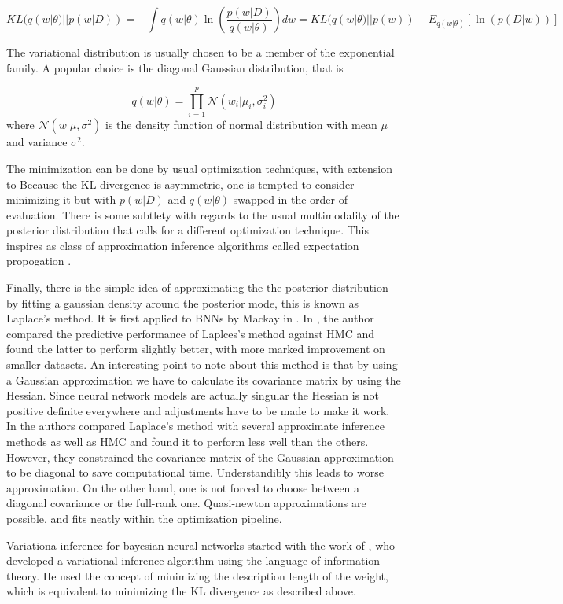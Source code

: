 \documentclass{book}
\begin{document}
\begin{enumerate}
\[ KL(q(w|\theta) || p(w|D)) = -\int q(w|\theta) \ln(\frac{p(w|D)}{q(w|\theta)}) dw = KL(q(w|\theta)||p(w)) - E_{q(w|\theta)}[\ln(p(D|w))] \]

The variational distribution is usually chosen to be a member of the exponential
family. A popular choice is the diagonal Gaussian distribution, that is 

\[ q(w|\theta) = \prod_{i=1}^p \mathcal{N}(w_i|\mu_i,\sigma^2_i) \]
where $\mathcal{N}(w|\mu,\sigma^2)$ is the density function of normal
distribution with mean $\mu$ and variance $\sigma^2$. 

The minimization can be done by usual optimization techniques, with extension to 
Because the KL divergence is asymmetric, one is tempted to consider
minimizing it but with $p(w|D)$ and $q(w|\theta)$ swapped in the order of
evaluation. There is some subtlety with regards to the usual multimodality of
the posterior distribution that calls for a different optimization technique.
This inspires as class of approximation inference algorithms called expectation
propogation \cite{minka2001expectation}. 

Finally, there is the simple idea of approximating the the posterior
distribution by fitting a gaussian density around the posterior mode, this is
known as Laplace's method. It is first applied to BNNs by Mackay in \cite{mackay1992evidence}. In \cite{vivarelli2001comparing}, the author compared the predictive performance of Laplces's method against HMC and found the latter to perform slightly better, with more marked improvement on smaller datasets. An interesting point to note about this method is that by using a Gaussian approximation we have to calculate its covariance matrix by using the Hessian. Since neural network models are actually singular the Hessian is not positive definite everywhere and adjustments have to be made to make it work. In \cite{hernandez2015probabilistic} the authors compared Laplace's method with several approximate inference methods as well as HMC and found it to perform less well than the others. However, they constrained the covariance matrix of the Gaussian approximation to be diagonal to save computational time. Understandibly this leads to worse approximation. On the other hand, one is not forced to choose between a diagonal covariance or the full-rank one. Quasi-newton approximations are possible, and fits neatly within the optimization pipeline.

Variationa inference for bayesian neural networks started with the work of \cite{hinton1993keeping}, who developed a variational inference algorithm using the language of information theory. He used the concept of minimizing the description length of the weight, which is equivalent to minimizing the KL divergence as described above. 


\end{enumerate}
\end{document}
